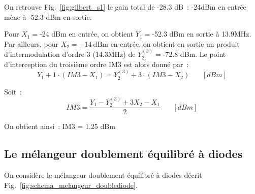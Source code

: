 \documentclass{article}
\begin{document}
On retrouve Fig.~\ref{fig:gilbert_s1} le gain total de -28.3 dB~: -24dBm en entrée mène à -52.3 dBm en sortie.

Pour $X_1 = $-24 dBm en entrée, on obtient $Y_1 = $-52.3 dBm en sortie à 13.9MHz. Par ailleurs, pour ${X_2 = \mathrm{-14~dBm}}$ en entrée, on obtient en sortie un produit d'intermodulation d'ordre 3 (14.3MHz) de $Y_2^{(3)} = $-72.8 dBm. Le point d'interception du troisième ordre IM3 est alors donné par~:
\begin{equation*}
Y_1 + 1\cdot(IM3-X_1) = Y_2^{(3)}+3\cdot(IM3-X_2)~~~~~~~~[dBm]
\end{equation*}

Soit~: 
\begin{equation*}
IM3=\frac{Y_1 - Y_2^{(3)} + 3 X_2 - X_1}{2}~~~~~~~~[dBm]
\end{equation*}

On obtient ainsi~: IM3 = 1.25 dBm

%





\subsection{Le mélangeur doublement équilibré à diodes}

On considère le mélangeur doublement équilibré à diodes décrit Fig.~\ref{fig:schema_melangeur_doublediode}.
\end{document}
